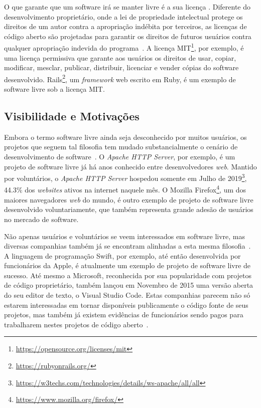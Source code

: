 O que garante que um software irá se manter livre é a sua licença \citep{KAVANAGH2004297}. Diferente do desenvolvimento proprietário, onde a lei de propriedade intelectual protege os direitos de um autor contra a apropriação indébita por terceiros, as licenças de código aberto são projetadas para garantir os direitos de futuros usuários contra qualquer apropriação indevida do programa~\citep{von2003open}. A licença MIT\footnote{\url{https://opensource.org/licenses/mit}}, por exemplo, é uma licença permissiva que garante aos usuários os direitos de usar, copiar, modificar, mesclar, publicar, distribuir, licenciar e vender cópias do software desenvolvido. Rails\footnote{\url{https://rubyonrails.org/}}, um \textit{framework} web escrito em Ruby, é um exemplo de software livre sob a licença MIT.


\subsection{Visibilidade e Motivações}
Embora o termo software livre ainda seja desconhecido por muitos usuários, os projetos que seguem tal filosofia tem mudado substancialmente o cenário de desenvolvimento de software~\citep{BITZER20061}. O \textit{Apache HTTP Server}, por exemplo, é um projeto de software livre já há anos conhecido entre desenvolvedores \textit{web}. Mantido por voluntários, o \textit{Apache HTTP Server} hospedou somente em Julho de 2019\footnote{\url{https://w3techs.com/technologies/details/ws-apache/all/all}}, 44.3$\%$ dos \textit{websites} ativos na internet naquele mês. O Mozilla Firefox\footnote{\url{https://www.mozilla.org/firefox/}}, um dos maiores navegadores \textit{web} do mundo, é outro exemplo de projeto de software livre desenvolvido voluntariamente, que também representa grande adesão de usuários no mercado de software.

Não apenas usuários e voluntários se veem interessados em software livre, mas diversas companhias também já se encontram alinhadas a esta mesma filosofia~\citep{pinto2018challenges}. A linguagem de programação Swift, por exemplo, até então desenvolvida por funcionários da Apple, é atualmente um exemplo de projeto de software livre de sucesso. Até mesmo a Microsoft, reconhecida por sua popularidade com projetos de código proprietário, também lançou em Novembro de 2015 uma versão aberta do seu editor de texto, o Visual Studio Code. Estas companhias parecem não só estarem interessadas em tornar disponíveis publicamente o código fonte de seus projetos, mas também já existem evidências de funcionários sendo pagos para trabalharem nestes projetos de código aberto~\citep{dias2018drives}.

